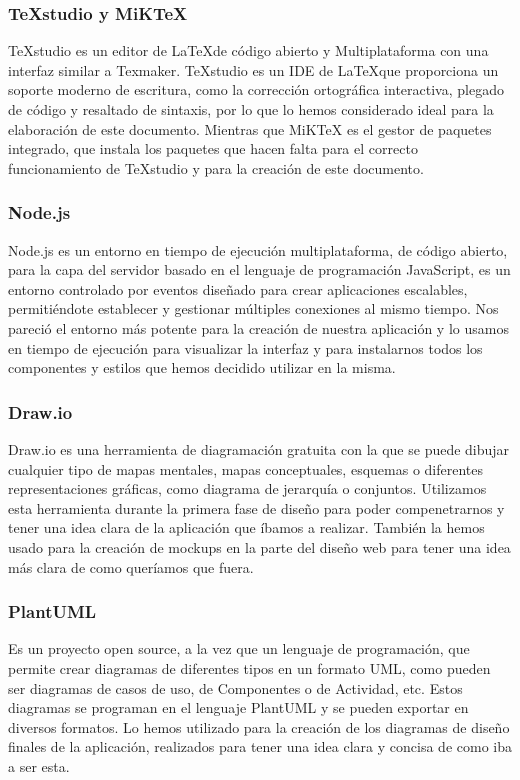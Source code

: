  		\subsubsection*{TeXstudio y MiKTeX}
			TeXstudio es un editor de \LaTeX\space de código abierto y Multiplataforma con una interfaz similar a Texmaker. TeXstudio es un IDE de \LaTeX\space que proporciona un soporte moderno de escritura, como la corrección ortográfica interactiva, plegado de código y resaltado de sintaxis, por lo que lo hemos considerado ideal para la elaboración de este documento.
			Mientras que MiKTeX es el gestor de paquetes integrado, que instala los paquetes que hacen falta para el correcto funcionamiento de TeXstudio y para la creación de este documento.
			
		\subsubsection*{Node.js}	
			Node.js es un entorno en tiempo de ejecución multiplataforma, de código abierto, para la capa del servidor basado en el lenguaje de programación JavaScript, es un entorno controlado por eventos diseñado para crear aplicaciones escalables, permitiéndote establecer y gestionar múltiples conexiones al mismo tiempo.
			Nos pareció el entorno más potente para la creación de nuestra aplicación y lo usamos en tiempo de ejecución para visualizar la interfaz y para instalarnos todos los componentes y estilos que hemos decidido utilizar en la misma.
			
		
		\subsubsection*{Draw.io}
			Draw.io es una herramienta de diagramación gratuita con la que se puede dibujar cualquier tipo de mapas mentales, mapas conceptuales, esquemas o diferentes representaciones gráficas, como diagrama de jerarquía o conjuntos.
			Utilizamos esta herramienta durante la primera fase de diseño para poder compenetrarnos y tener una idea clara de la aplicación que íbamos a realizar.
			También la hemos usado para la creación de mockups en la parte del diseño web para tener una idea más clara de como queríamos que fuera.
			
		\subsubsection*{PlantUML}	
			Es un proyecto open source, a la vez que un lenguaje de programación, que permite crear diagramas de diferentes tipos en un formato UML, como pueden ser diagramas de casos de uso, de Componentes o de Actividad, etc. Estos diagramas se programan en el lenguaje PlantUML y se pueden exportar en diversos formatos. Lo hemos utilizado para la creación de los diagramas de diseño finales de la aplicación, realizados para tener una idea clara y concisa de como iba a ser esta.
				
